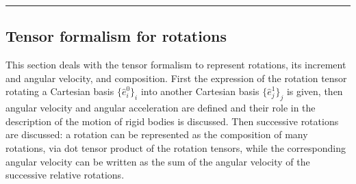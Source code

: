 \documentclass[letterpaper,10pt,english]{jupyterBook}
\begin{document}
\bigskip\hrule\bigskip


\sphinxstepscope


\subsection{Tensor formalism for rotations}
\label{\detokenize{ch/kinematics-rotations-tensors:tensor-formalism-for-rotations}}\label{\detokenize{ch/kinematics-rotations-tensors:classical-mechanics-kinematics-rotations-tensor}}\label{\detokenize{ch/kinematics-rotations-tensors::doc}}
\sphinxAtStartPar
This section deals with the tensor formalism to represent rotations, its increment and angular velocity, and composition. First the expression of the rotation tensor rotating a Cartesian basis \(\{ \hat{e}_i^0\}_i\) into another Cartesian basis \(\{ \hat{e}^1_j\}_j\) is given, then angular velocity and angular acceleration are defined and their role in the description of the motion of rigid bodies is discussed.
Then successive rotations are discussed: a rotation can be represented as the composition of many rotations, via dot tensor product of the rotation tensors, while the corresponding angular velocity can be written as the sum of the angular velocity of the successive relative rotations.
\end{document}

